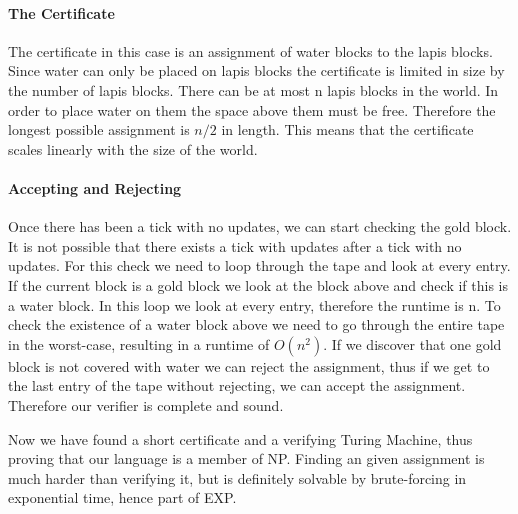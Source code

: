 	\paragraph{The Certificate}
	The certificate in this case is an assignment of water blocks to the lapis blocks.
	Since water can only be placed on lapis blocks the certificate is limited in size by the number of lapis blocks.
	There can be at most n lapis blocks in the world. In order to place water on them the space above them must be free.
	Therefore the longest possible assignment is $n/2$ in length. This means that the certificate scales linearly with the size of the world.
	
	\paragraph{Accepting and Rejecting}
	Once there has been a tick with no updates, we can start checking the gold block. It is not possible that there exists a tick with updates after a tick with no updates. For this check we need to loop through the tape and look at every entry. If the current block is a gold block we look at the block above and check if this is a water block. In this loop we look at every entry, therefore the runtime is n. To check the existence of a water block above we need to go through the entire tape in the worst-case, resulting in a runtime of $O(n^{2})$. If we discover that one gold block is not covered with water we can reject the assignment, thus if we get to the last entry of the tape without rejecting, we can accept the assignment. Therefore our verifier is complete and sound.
	
	
	Now we have found a short certificate and a verifying Turing Machine, thus proving that our language is a member of NP. Finding an given assignment is much harder than verifying it, but is definitely solvable by brute-forcing in exponential time, hence part of EXP.
